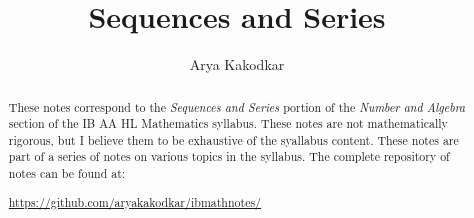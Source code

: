 \documentclass[a4paper]{report}
\author{Arya Kakodkar}
\title{Sequences and Series}
\begin{document}
\maketitle

\begin{abstract}
	These notes correspond to the \textit{Sequences and Series} portion of the \textit{Number and Algebra}
	section of the IB AA HL Mathematics syllabus. These notes are not mathematically rigorous, but I believe them 
	to be exhaustive of the syallabus content. These notes are part of a series of notes on various topics in the syllabus.
	The complete repository of notes can be found at: 
	\begin{center}
		\url{https://github.com/aryakakodkar/ibmathnotes/}
	\end{center}
\end{abstract}

\newpage

\tableofcontents





\end{document}
